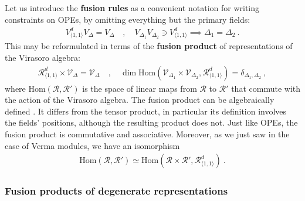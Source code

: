 \documentclass[12pt, a4paper]{article}
\theoremstyle{break}
\begin{document}
Let us introduce the \textbf{fusion rules} as a convenient notation for writing constraints on OPEs, by omitting everything but the primary fields:
\begin{align}
 V^d_{\langle 1,1\rangle} V_{\Delta} = V_\Delta \quad , \quad V_{\Delta_1} V_{\Delta_2} \ni V^d_{\langle 1,1\rangle} \implies \Delta_1=\Delta_2\ . 
\end{align}
This may be reformulated in terms of 
the \textbf{fusion product} of representations of the Virasoro algebra:
\begin{align}
 \mathcal{R}^d_{\langle 1,1\rangle} \times \mathcal{V}_\Delta = \mathcal{V}_\Delta \quad , \quad \dim\text{Hom}\left(\mathcal{V}_{\Delta_1}\times \mathcal{V}_{\Delta_2}, \mathcal{R}^d_{\langle 1,1\rangle}\right) = \delta_{\Delta_1,\Delta_2}\ ,
 \label{rtv}
\end{align}
where $\text{Hom}(\mathcal{R},\mathcal{R}')$ is the space of linear maps from $\mathcal{R}$ to $\mathcal{R}'$ that commute with the action of the Virasoro algebra. 
The fusion product can be algebraically defined \cite{gab99}. It differs from the tensor product, in particular its definition involves the fields' positions, although the resulting product does not. Just like OPEs, the fusion product is commutative and associative. Moreover, as we just saw in the case of Verma modules, we have an isomorphism
\begin{align}
 \text{Hom}\left(\mathcal{R},\mathcal{R}'\right) \simeq \text{Hom}\left(\mathcal{R}\times\mathcal{R}',\mathcal{R}^d_{\langle 1,1\rangle}\right)\ . 
 \label{hrr}
\end{align}

\subsubsection{Fusion products of degenerate representations}
\end{document}

